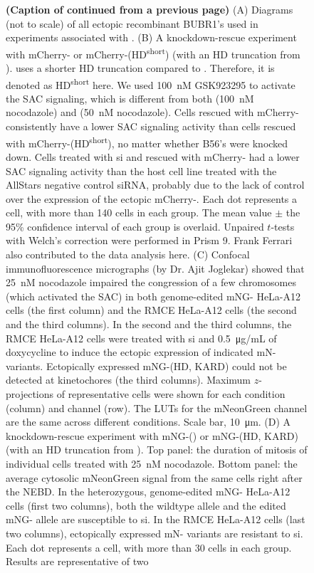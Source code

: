\begin{figure}
  \noindent\justifying \textbf{(Caption of  continued from a previous page)} (A) Diagrams (not to scale) of all ectopic recombinant BUBR1's used in experiments associated with . (B) A  knockdown-rescue experiment with mCherry- or mCherry-(\textDelta{}HD\textsuperscript{short}) (with an HD truncation from \cite{BubR1TwoPools}). \cite{BubR1TwoPools} uses a shorter HD truncation compared to \cite{BubBiochem}. Therefore, it is denoted as \textDelta{}HD\textsuperscript{short} here. We used \SI{100}{nM} GSK923295 to activate the SAC signaling, which is different from both \cite{BubR1TwoPools} (\SI{100}{nM} nocodazole) and \cite{BubBiochem} (\SI{50}{nM} nocodazole). Cells rescued with mCherry- consistently have a lower SAC signaling activity than cells rescued with mCherry-(\textDelta{}HD\textsuperscript{short}), no matter whether B56's were knocked down. Cells treated with si and rescued with mCherry- had a lower SAC signaling activity than the host cell line treated with the AllStars negative control siRNA, probably due to the lack of control over the expression of the ectopic mCherry-. Each dot represents a cell, with more than 140 cells in each group. The mean value $\pm$ the 95\% confidence interval of each group is overlaid. Unpaired $t$-tests with Welch's correction were performed in Prism 9. Frank Ferrari also contributed to the data analysis here. (C) Confocal immunofluorescence micrographs (by Dr. Ajit Joglekar) showed that \SI{25}{nM} nocodazole impaired the congression of a few chromosomes (which activated the SAC) in both genome-edited mNG- HeLa-A12 cells (the first column) and the RMCE HeLa-A12 cells (the second and the third columns). In the second and the third columns, the RMCE HeLa-A12 cells were treated with si and \SI{0.5}{\micro g/mL} of doxycycline to induce the ectopic expression of indicated mN- variants. Ectopically expressed mNG-(\textDelta{}HD, \textDelta{}KARD) could not be detected at kinetochores (the third columns). Maximum $z$-projections of representative cells were shown for each condition (column) and channel (row). The LUTs for the mNeonGreen channel are the same across different conditions. Scale bar, \SI{10}{\micro m}. (D) A  knockdown-rescue experiment with mNG-() or mNG-(\textDelta{}HD, \textDelta{}KARD) (with an HD truncation from \cite{BubBiochem}). Top panel: the duration of mitosis of individual cells treated with \SI{25}{nM} nocodazole. Bottom panel: the average cytosolic mNeonGreen signal from the same cells right after the NEBD. In the heterozygous, genome-edited mNG- HeLa-A12 cells (first two columns), both the wildtype allele and the edited mNG- allele are susceptible to si. In the RMCE HeLa-A12 cells (last two columns), ectopically expressed mN- variants are resistant to si. Each dot represents a cell, with more than 30 cells in each group. Results are representative of two 
\end{figure}
